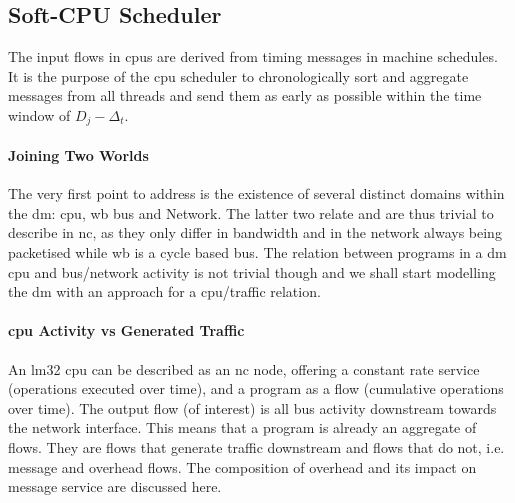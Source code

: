 \subsection{Soft-CPU Scheduler}
The input flows in \gls{cpu}s are derived from timing messages in machine schedules. It is the purpose of the \gls{cpu} scheduler to chronologically sort
and aggregate messages from all threads and send them as early as possible within the time window of $D_j - \Delta_t$.

\paragraph{Joining Two Worlds}
The very first point to address is the existence of several distinct domains within the \gls{dm}: \gls{cpu}, \gls{wb} bus and Network.
The latter two relate and are thus trivial to describe in \gls{nc}, as they only differ in bandwidth and in the network always being packetised while \gls{wb} is a cycle based bus.
The relation between programs in a \gls{dm} \gls{cpu} and bus/network activity is not trivial though and
we shall start modelling the \gls{dm} with an approach for a \gls{cpu}/traffic relation.
\paragraph{\gls{cpu} Activity vs Generated Traffic}
An \gls{lm32} \gls{cpu} can be described as an \gls{nc} node, offering a constant rate service (operations executed over time), and a program as a flow (cumulative operations over time).
The output flow (of interest) is all bus activity downstream towards the network interface. This means that a program is already an aggregate of flows. They are flows that generate traffic downstream and flows
that do not, i.e. message and overhead flows. The composition of overhead and its impact on message service are discussed here.

